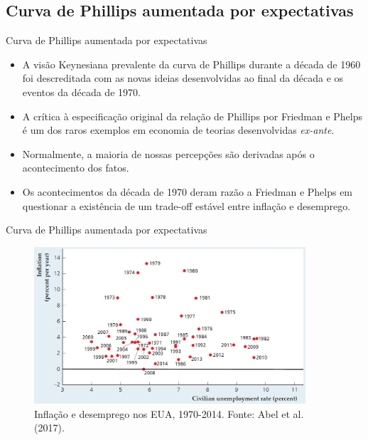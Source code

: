 \documentclass[10pt]{beamer}
\begin{document}
\subsection{Curva de Phillips aumentada por expectativas}
\begin{frame}{Curva de Phillips aumentada por expectativas}
    \begin{itemize}
        \item A visão Keynesiana prevalente da curva de Phillips durante a década de 1960 foi descreditada com as novas ideias desenvolvidas ao final da década e os eventos da década de 1970.
        \bigskip
        \item A crítica à especificação original da relação de Phillips por Friedman e Phelps é um dos raros exemplos em economia de teorias desenvolvidas \emph{ex-ante}.
        \bigskip
        \item Normalmente, a maioria de nossas percepções são derivadas após o acontecimento dos fatos.
        \bigskip
        \item Os acontecimentos da década de 1970 deram razão a Friedman e Phelps em questionar a existência de um trade-off estável entre inflação e desemprego.
    \end{itemize}    
\end{frame}

\begin{frame}{Curva de Phillips aumentada por expectativas}
    \begin{figure}
        \centering
        \includegraphics[width=0.9\textwidth]{./figures/aula10_fig10.JPG}
        \caption{Inflação e desemprego nos EUA, 1970-2014. Fonte: Abel et al. (2017).}
        \label{fig10}
    \end{figure}
\end{frame}
\end{document}

